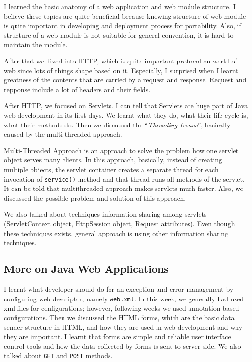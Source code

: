 I learned the basic anatomy of a web application and web module structure. I believe these topics are quite beneficial because knowing structure of web module is quite important in developing and deployment process for portability. Also, if structure of a web module is not suitable for general convention, it is hard to maintain the module.

After that we dived into HTTP, which is quite important protocol on world of web since lots of things shape based on it. Especially, I surprised when I learnt greatness of the contents that are carried by a request and response. Request and repponse include a lot of headers and their fields.

After HTTP, we focused on Servlets. I can tell that Servlets are huge part of Java web development in its first days. We learnt what they do, what their life cycle is, what their methods do. Then we discussed the ``\textit{Threading Issues}'', basically caused by the multi-threaded approach.

Multi-Threaded Approach is an approach to solve the problem how one servlet object serves many clients. In this approach, basically, instead of creating multiple objects, the servlet container creates a separate thread for each invocation of \texttt{service()} method and that thread runs all methods of the servlet. It can be told that multithreaded approach makes servlets much faster. Also, we discussed the possible problem and solution of this approach.

We also talked about techniques information sharing among servlets (ServletContext object, HttpSession object, Request attributes). Even though these techniques exists, general approach is using other information sharing techniques.

\subsection{More on Java Web Applications}

I learnt what developer should do for an exception and error management by configuring web descriptor, namely \texttt{web.xml}. In this week, we generally had used xml files for configurations; however, following weeks we used annotation based configurations.  Then we discussed the HTML forms, which are the basic data sender structure in HTML, and how they are used in web development and why they are important. I learnt that forms are simple and reliable user interface control tools and how the data collected by forms is sent to server side. We also talked about \texttt{GET} and \texttt{POST} methods.

